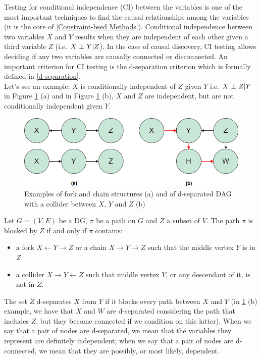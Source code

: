 Testing for conditional independence (CI) between the variables is one of the most important techniques
to find the causal relationships among the variables (it is the core of \ref{Constraint-bsed Methods}). Conditional independence between two variables $X$ and
$Y$ results when they are independent of each other given a third variable $Z$ (i.e. $X \independent Y | Z$). In the case of causal discovery, CI testing allows deciding if any two variables are causally connected or disconnected. An important criterion for CI testing is the d-separation criterion which is formally defined in \ref{d-separation}.\\
Let's see an example: $X$ is conditionally independent of $Z$ given $Y$ i.e. $X \independent Z | Y$ in Figure \ref{3} (a) and in Figure \ref{3} (b), $X$ and $Z$ are independent, but are not conditionally independent given $Y$.\\ 

\begin{figure}[!h]
    \centering
    \includegraphics[width=1\linewidth]{chapters/Images/D-SEPARATION.png}
    \caption{Examples of fork and chain structures (a) and of d-separated DAG with a collider between $X$, $Y$ and $Z$ (b)}
    \label{3}
\end{figure}

\begin{definition}[d-separation]\label{d-separation}
    Let $G =(V, E)$ be a DG, $\pi$ be a path on $G$ and $Z$ a subset of $V$. The path $\pi$ is blocked by $Z$ if and only if $\pi$ contains:
    \begin{itemize}
        \item a fork $X \leftarrow Y \rightarrow Z$ or a chain $X \rightarrow Y \rightarrow Z$ such that the middle vertex $Y$ is in $Z$
        \item a collider $X \rightarrow Y \leftarrow Z$ such that middle vertex $Y$, or any descendant of it, is not in $Z$.
    \end{itemize}
\end{definition}

The set $Z$ d-separates $X$ from $Y$ if it blocks every path between $X$ and $Y$ (in \ref{3} (b) example, we have that $X$ and $W$ are d-separated considering the path that includes $Z$, but they become connected if we condition on this latter). When we say that a pair of nodes are d-separated, we mean that the variables they represent are definitely independent; when we say that a pair of nodes are d-connected, we mean that they are possibly, or most likely, dependent.\\

